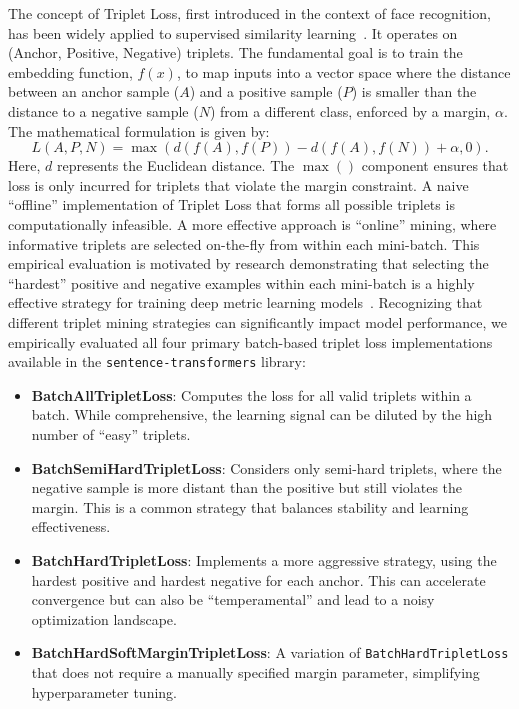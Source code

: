 The concept of Triplet Loss, first introduced in the context of face recognition, has been widely applied to supervised similarity learning~\cite{Yu2020}. It operates on (Anchor, Positive, Negative) triplets. The fundamental goal is to train the embedding function, \(f(x)\), to map inputs into a vector space where the distance between an anchor sample (\(A\)) and a positive sample (\(P\)) is smaller than the distance to a negative sample (\(N\)) from a different class, enforced by a margin, \(\alpha\). The mathematical formulation is given by:
\[ L(A,P,N)=\max(d(f(A),f(P))-d(f(A),f(N))+\alpha,0). \]
Here, \(d\) represents the Euclidean distance. The \(\max()\) component ensures that loss is only incurred for triplets that violate the margin constraint. A naive ``offline'' implementation of Triplet Loss that forms all possible triplets is computationally infeasible. A more effective approach is ``online'' mining, where informative triplets are selected on-the-fly from within each mini-batch. This empirical evaluation is motivated by research demonstrating that selecting the ``hardest'' positive and negative examples within each mini-batch is a highly effective strategy for training deep metric learning models~\cite{hermans2017defensetripletlossperson}.  Recognizing that different triplet mining strategies can significantly impact model performance, we empirically evaluated all four primary batch-based triplet loss implementations available in the \verb|sentence-transformers| library:
\begin{itemize}
    \item \textbf{BatchAllTripletLoss}: Computes the loss for all valid triplets within a batch. While comprehensive, the learning signal can be diluted by the high number of ``easy'' triplets.
    \item \textbf{BatchSemiHardTripletLoss}: Considers only semi-hard triplets, where the negative sample is more distant than the positive but still violates the margin. This is a common strategy that balances stability and learning effectiveness.
    \item \textbf{BatchHardTripletLoss}: Implements a more aggressive strategy, using the hardest positive and hardest negative for each anchor. This can accelerate convergence but can also be ``temperamental'' and lead to a noisy optimization landscape.
    \item \textbf{BatchHardSoftMarginTripletLoss}: A variation of \verb|BatchHardTripletLoss| that does not require a manually specified margin parameter, simplifying hyperparameter tuning.
\end{itemize}

